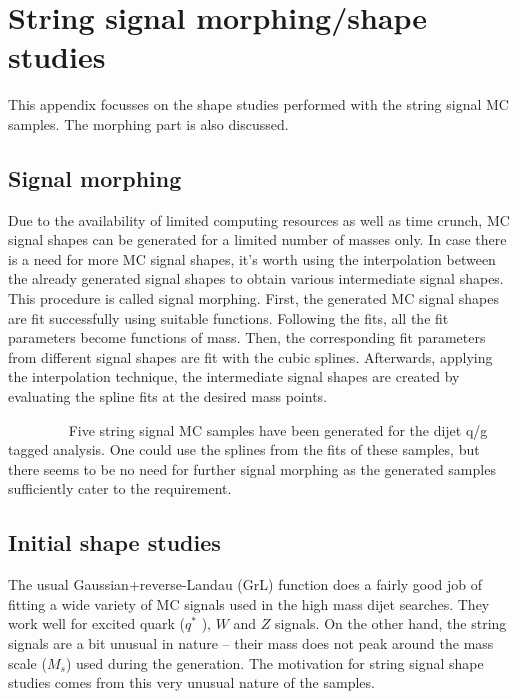 \section{String signal morphing/shape studies}
\label{sec:StrMorphShapeStudies} 

This appendix focusses on the shape studies performed with the string signal MC samples. The morphing part is also discussed.


\subsection{Signal morphing}
Due to the availability of limited computing resources as well as time crunch, MC signal shapes can be generated for a limited number of masses only. In case there is a need for more MC signal shapes, it's worth using the interpolation between the already generated signal shapes to obtain various intermediate signal shapes. This procedure is called signal morphing. First, the generated MC signal shapes are fit successfully using suitable functions. Following the fits, all the fit parameters become functions of mass. Then, the corresponding fit parameters from different signal shapes are fit with the cubic splines. Afterwards, applying the interpolation technique, the intermediate  signal shapes are created by evaluating the spline fits at the desired mass points. 

~~~~~~~~ Five string signal MC samples have been generated for the dijet q/g tagged analysis. One could use the splines from the fits of these samples, but there seems to be no need for further signal morphing as the generated samples sufficiently cater to the requirement.



\subsection{Initial shape studies}
\label{subsec:StrMorphShapeStudies:InitShapStud}

The usual Gaussian+reverse-Landau (GrL) function does a fairly good job of fitting a wide variety of MC signals used in the high mass dijet searches. They work well for excited quark ($q^{*}$ ), $W$ and $Z$ signals. On the other hand, the string signals are a bit unusual in nature -- their mass does not peak around the mass scale ($M_{s}$) used during the generation. The motivation for string signal shape studies comes from this very unusual nature of the samples. 

